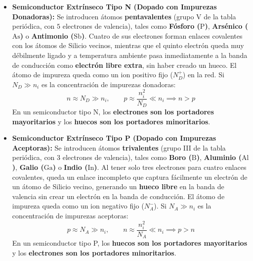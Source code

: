 \begin{itemize}[leftmargin=*]
    \item \textbf{Semiconductor Extrínseco Tipo N (Dopado con Impurezas Donadoras):}
    Se introducen átomos \textbf{pentavalentes} (grupo V de la tabla periódica, con $5$ electrones de valencia), tales como \textbf{Fósforo ($\text{P}$)}, \textbf{Arsénico ($\text{As}$)} o \textbf{Antimonio ($\text{Sb}$)}. Cuatro de sus electrones forman enlaces covalentes con los átomos de Silicio vecinos, mientras que el quinto electrón queda muy débilmente ligado y a temperatura ambiente pasa inmediatamente a la banda de conducción como \textbf{electrón libre extra}, sin haber creado un hueco. El átomo de impureza queda como un ion positivo fijo ($N_D^+$) en la red.
    Si $N_D \gg n_i$ es la concentración de impurezas donadoras:
    \begin{equation}
        n \approx N_D \gg n_i, \qquad p \approx \frac{n_i^2}{N_D} \ll n_i \implies n > p
    \end{equation}
    En un semiconductor tipo N, los \textbf{electrones son los portadores mayoritarios} y los \textbf{huecos son los portadores minoritarios}.

    \item \textbf{Semiconductor Extrínseco Tipo P (Dopado con Impurezas Aceptoras):}
    Se introducen átomos \textbf{trivalentes} (grupo III de la tabla periódica, con $3$ electrones de valencia), tales como \textbf{Boro ($\text{B}$)}, \textbf{Aluminio ($\text{Al}$)}, \textbf{Galio ($\text{Ga}$)} o \textbf{Indio ($\text{In}$)}. Al tener solo tres electrones para cuatro enlaces covalentes, queda un enlace incompleto que captura fácilmente un electrón de un átomo de Silicio vecino, generando un \textbf{hueco libre} en la banda de valencia sin crear un electrón en la banda de conducción. El átomo de impureza queda como un ion negativo fijo ($N_A^-$).
    Si $N_A \gg n_i$ es la concentración de impurezas aceptoras:
    \begin{equation}
        p \approx N_A \gg n_i, \qquad n \approx \frac{n_i^2}{N_A} \ll n_i \implies p > n
    \end{equation}
    En un semiconductor tipo P, los \textbf{huecos son los portadores mayoritarios} y los \textbf{electrones son los portadores minoritarios}.
\end{itemize}

